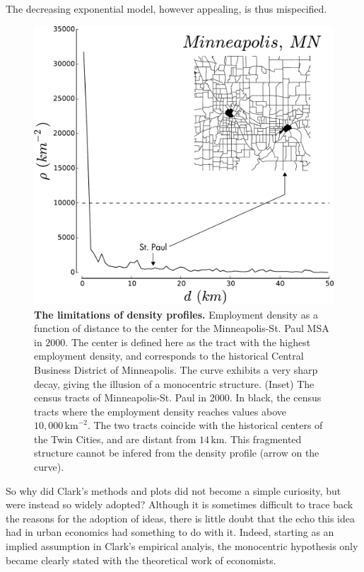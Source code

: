 The decreasing exponential model, however appealing, is thus mispecified.


\begin{figure}
    \centering
    \includegraphics[width=\textwidth]{./gfx/chapter-monocentric/distance_center_minneapolis.pdf}
    \caption{{\bf The limitations of density profiles.} Employment density as a function of distance to the center for the
    Minneapolis-St. Paul MSA in $2000$. The center is defined here as the
    tract with the highest employment density, and corresponds to the historical
    Central Business District of Minneapolis. The curve exhibits a very sharp
    decay, giving the illusion of a monocentric structure. (Inset) The census tracts
    of Minneapolis-St. Paul in 2000. In black, the census tracts where the
    employment density reaches values above $10,000\,\text{km}^{-2}$. The two tracts
    coincide with the historical centers of the Twin Cities, and are distant from
    $14\,\text{km}$. This fragmented structure cannot be infered from the density
    profile (arrow on the curve).
    \label{fig:distance_center_minneapolis}}
\end{figure}


So why did Clark's methods and plots did not become a simple curiosity, but were
instead so widely adopted? Although it is sometimes difficult to trace back the
reasons for the adoption of ideas, there is little doubt that the echo this idea had in urban
economics had something to do with it. Indeed, starting as an implied assumption
in Clark's empirical analyis, the monocentric hypothesis only became clearly stated with
the theoretical work of economists.



